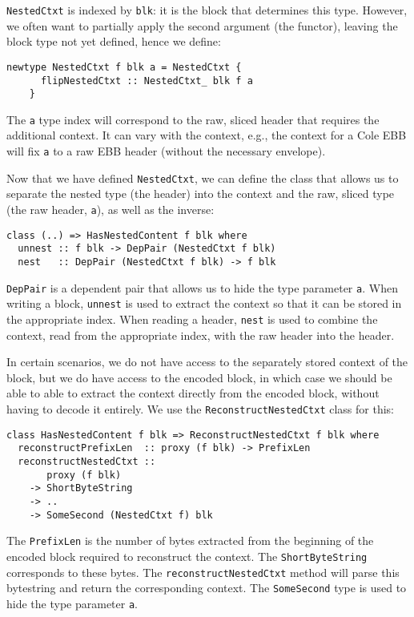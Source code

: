 \lstinline!NestedCtxt! is indexed by \lstinline!blk!: it is the block that
determines this type. However, we often want to partially apply the second
argument (the functor), leaving the block type not yet defined, hence we define:
\begin{lstlisting}
newtype NestedCtxt f blk a = NestedCtxt {
      flipNestedCtxt :: NestedCtxt_ blk f a
    }
\end{lstlisting}
The \lstinline!a! type index will correspond to the raw, sliced header that
requires the additional context. It can vary with the context, e.g., the context
for a Cole EBB will fix \lstinline!a! to a raw EBB header (without the
necessary envelope).

Now that we have defined \lstinline!NestedCtxt!, we can define the class that
allows us to separate the nested type (the header) into the context and the raw,
sliced type (the raw header, \lstinline!a!), as well as the inverse:
\begin{lstlisting}
class (..) => HasNestedContent f blk where
  unnest :: f blk -> DepPair (NestedCtxt f blk)
  nest   :: DepPair (NestedCtxt f blk) -> f blk
\end{lstlisting}
\lstinline!DepPair! is a dependent pair that allows us to hide the type
parameter \lstinline!a!. When writing a block, \lstinline!unnest! is used to
extract the context so that it can be stored in the appropriate index. When
reading a header, \lstinline!nest! is used to combine the context, read from the
appropriate index, with the raw header into the header.

In certain scenarios, we do not have access to the separately stored context of
the block, but we do have access to the encoded block, in which case we should
be able to able to extract the context directly from the encoded block, without
having to decode it entirely. We use the \lstinline!ReconstructNestedCtxt! class
for this:
\begin{lstlisting}
class HasNestedContent f blk => ReconstructNestedCtxt f blk where
  reconstructPrefixLen  :: proxy (f blk) -> PrefixLen
  reconstructNestedCtxt ::
       proxy (f blk)
    -> ShortByteString
    -> ..
    -> SomeSecond (NestedCtxt f) blk
\end{lstlisting}
The \lstinline!PrefixLen! is the number of bytes extracted from the beginning of
the encoded block required to reconstruct the context. The
\lstinline!ShortByteString! corresponds to these bytes. The
\lstinline!reconstructNestedCtxt! method will parse this bytestring and return
the corresponding context. The \lstinline!SomeSecond! type is used to hide the
type parameter \lstinline!a!.

